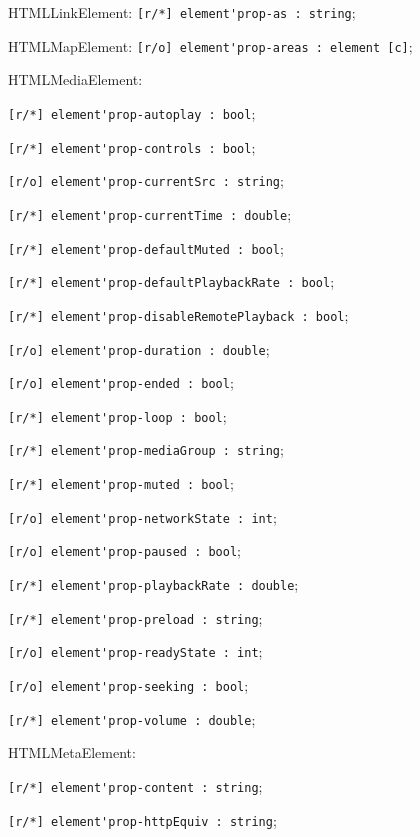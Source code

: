 \begin{icItems}
	\item HTMLLinkElement: \lstinline|[r/*] element'prop-as : string|;
	\item HTMLMapElement: \lstinline|[r/o] element'prop-areas : element [c]|;
	
	\item HTMLMediaElement:
	\begin{icItems}
		\item \lstinline|[r/*] element'prop-autoplay : bool|;
		\item \lstinline|[r/*] element'prop-controls : bool|;
		\item \lstinline|[r/o] element'prop-currentSrc : string|;
		\item \lstinline|[r/*] element'prop-currentTime : double|;
		\item \lstinline|[r/*] element'prop-defaultMuted : bool|;
		\item \lstinline|[r/*] element'prop-defaultPlaybackRate : bool|;
		\item \lstinline|[r/*] element'prop-disableRemotePlayback : bool|;
		\item \lstinline|[r/o] element'prop-duration : double|;
		\item \lstinline|[r/o] element'prop-ended : bool|;
		\item \lstinline|[r/*] element'prop-loop : bool|;
		\item \lstinline|[r/*] element'prop-mediaGroup : string|;
		\item \lstinline|[r/*] element'prop-muted : bool|;
		\item \lstinline|[r/o] element'prop-networkState : int|;
		\item \lstinline|[r/o] element'prop-paused : bool|;
		\item \lstinline|[r/*] element'prop-playbackRate : double|;
		\item \lstinline|[r/*] element'prop-preload : string|;
		\item \lstinline|[r/o] element'prop-readyState : int|;
		\item \lstinline|[r/o] element'prop-seeking : bool|;
		\item \lstinline|[r/*] element'prop-volume : double|;
	\end{icItems}
	
	\item HTMLMetaElement:
	\begin{icItems}
		\item \lstinline|[r/*] element'prop-content : string|;
		\item \lstinline|[r/*] element'prop-httpEquiv : string|;
	\end{icItems}
	

\end{icItems}
